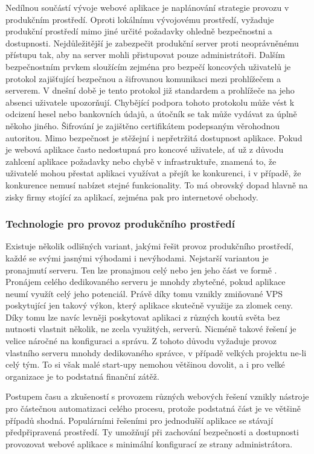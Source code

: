 	Nedílnou součástí vývoje webové aplikace je naplánování strategie provozu v produkčním prostředí.
	Oproti lokálnímu vývojovému prostředí, vyžaduje produkční prostředí mimo jiné určité požadavky ohledně
	bezpečnostni a dostupnosti.
	Nejdůležitější je zabezpečit produkční server proti neoprávněnému přístupu tak, aby na server mohli přistupovat pouze
	administrátoři.
	Dalším bezpečnostním prvkem sloužícím zejména pro bezpečí koncových uživatelů je  protokol zajišťující bezpečnou
	a šifrovanou komunikaci mezi prohlížečem a serverem.
	V dnešní době je tento protokol již standardem a prohlížeče na jeho absenci uživatele upozorňují.
	Chybějící podpora tohoto protokolu může vést k odcizení hesel nebo bankovních údajů, a útočník se tak
	může vydávat za úplně někoho jiného.
	Šifrování je zajištěno certifikátem  podepsaným věrohodnou autoritou.
	Mimo bezpečnost je stěžejní i nepřetržitá dostupnost aplikace.
	Pokud je webová aplikace často nedostupná pro koncové uživatele, ať už z důvodu zahlcení aplikace požadavky nebo
	chybě v infrastruktuře, znamená to, že uživatelé mohou přestat aplikaci využívat a přejít
	ke konkurenci, i v případě, že konkurence nemusí nabízet stejné funkcionality.
	To má obrovský dopad hlavně na zisky firmy stojící za aplikací, zejména pak pro internetové obchody.

		\subsubsection{Technologie pro provoz produkčního prostředí}

		Existuje několik odlišných variant, jakými řešit provoz produkčního prostředí, každé se svými jasnými výhodami i nevýhodami.
		Nejstarší variantou je pronajmutí serveru.
		Ten lze pronajmou celý nebo jen jeho část ve formě .
		Pronájem celého dedikovaného serveru je mnohdy zbytečné, pokud aplikace neumí využít celý jeho potenciál.
		Právě díky tomu vznikly zmiňované \Ac{VPS} poskytující jen takový výkon, který aplikace skutečně využije za
		zlomek ceny.
		Díky tomu lze navíc levněji poskytovat aplikaci z různých koutů světa bez nutnosti vlastnit několik, ne zcela
		využitých, serverů.
		Nicméně takové řešení je velice náročné na konfiguraci a správu.
		Z tohoto důvodu vyžaduje provoz vlastního serveru mnohdy dedikovaného správce, v případě velkých projektu ne-li celý tým.
		To si však malé start-upy nemohou většinou dovolit, a i pro velké organizace je to podstatná finanční zátěž.

		Postupem času a zkušeností s provozem různých webových řešení vznikly nástroje pro částečnou automatizaci
		celého procesu, protože podstatná část je ve většině případů shodná.
		Populárními řešeními pro jednodušší aplikace se stávají předpřipravená prostředí.
		Ty umožňují při zachování bezpečnosti a dostupnosti provozovat webové aplikace s minimální konfigurací ze strany
		administrátora.

